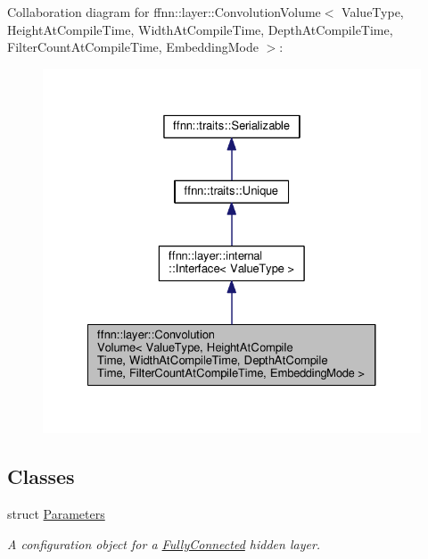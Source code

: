 Collaboration diagram for ffnn\-:\-:layer\-:\-:Convolution\-Volume$<$ Value\-Type, Height\-At\-Compile\-Time, Width\-At\-Compile\-Time, Depth\-At\-Compile\-Time, Filter\-Count\-At\-Compile\-Time, Embedding\-Mode $>$\-:
\nopagebreak
\begin{figure}[H]
\begin{center}
\leavevmode
\includegraphics[width=326pt]{classffnn_1_1layer_1_1_convolution_volume__coll__graph}
\end{center}
\end{figure}
\subsection*{Classes}
\begin{DoxyCompactItemize}
\item 
struct \hyperlink{structffnn_1_1layer_1_1_convolution_volume_1_1_parameters}{Parameters}
\begin{DoxyCompactList}\small\item\em A configuration object for a \hyperlink{classffnn_1_1layer_1_1_fully_connected}{Fully\-Connected} hidden layer. \end{DoxyCompactList}\end{DoxyCompactItemize}
